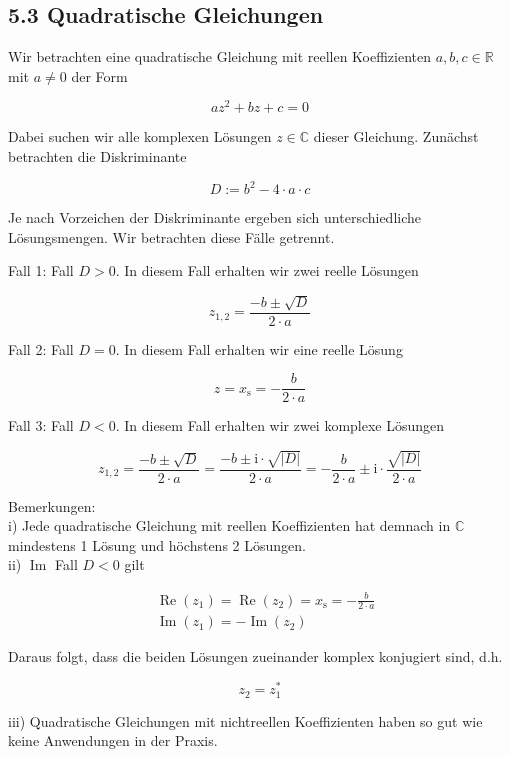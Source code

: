 \documentclass[10pt]{article}
\begin{document}
\subsection*{5.3 Quadratische Gleichungen}
Wir betrachten eine quadratische Gleichung mit reellen Koeffizienten $a, b, c \in \mathbb{R}$ mit $a \neq 0$ der Form


\begin{equation*}
a z^{2}+b z+c=0 \tag{5.20}
\end{equation*}


Dabei suchen wir alle komplexen Lösungen $z \in \mathbb{C}$ dieser Gleichung. Zunächst betrachten die Diskriminante


\begin{equation*}
D:=b^{2}-4 \cdot a \cdot c \tag{5.21}
\end{equation*}


Je nach Vorzeichen der Diskriminante ergeben sich unterschiedliche Lösungsmengen. Wir betrachten diese Fälle getrennt.

Fall 1: Fall $D>0$. In diesem Fall erhalten wir zwei reelle Lösungen


\begin{equation*}
z_{1,2}=\frac{-b \pm \sqrt{D}}{2 \cdot a} \tag{5.22}
\end{equation*}


Fall 2: Fall $D=0$. In diesem Fall erhalten wir eine reelle Lösung


\begin{equation*}
z=x_{\mathrm{s}}=-\frac{b}{2 \cdot a} \tag{5.23}
\end{equation*}


Fall 3: Fall $D<0$. In diesem Fall erhalten wir zwei komplexe Lösungen


\begin{equation*}
z_{1,2}=\frac{-b \pm \sqrt{D}}{2 \cdot a}=\frac{-b \pm \mathrm{i} \cdot \sqrt{|D|}}{2 \cdot a}=-\frac{b}{2 \cdot a} \pm \mathrm{i} \cdot \frac{\sqrt{|D|}}{2 \cdot a} \tag{5.24}
\end{equation*}


Bemerkungen:\\
i) Jede quadratische Gleichung mit reellen Koeffizienten hat demnach in $\mathbb{C}$ mindestens 1 Lösung und höchstens 2 Lösungen.\\
ii) $\operatorname{Im}$ Fall $D<0$ gilt


\begin{align*}
& \operatorname{Re}\left(z_{1}\right)=\operatorname{Re}\left(z_{2}\right)=x_{\mathrm{s}}=-\frac{b}{2 \cdot a}  \tag{5.25}\\
& \operatorname{Im}\left(z_{1}\right)=-\operatorname{Im}\left(z_{2}\right) \tag{5.26}
\end{align*}


Daraus folgt, dass die beiden Lösungen zueinander komplex konjugiert sind, d.h.


\begin{equation*}
z_{2}=z_{1}^{*} \tag{5.27}
\end{equation*}


iii) Quadratische Gleichungen mit nichtreellen Koeffizienten haben so gut wie keine Anwendungen in der Praxis.
\end{document}
